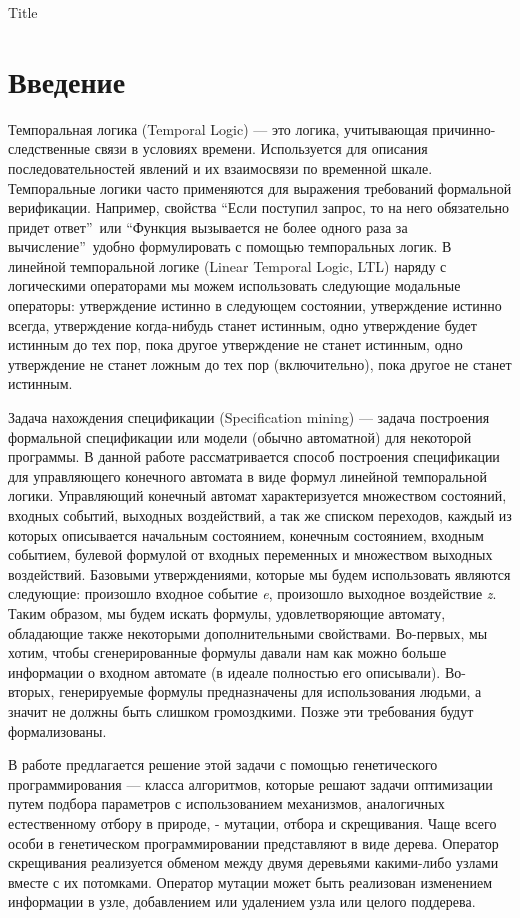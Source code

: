 \documentclass[12pt,fleqn]{article}
\begin{document}
\setlength{\grammarparsep}{0pt plus 1pt minus 1pt}

Title

\section*{Введение}

Темпоральная логика (Temporal Logic) --- это логика, учитывающая причинно-следственные связи в условиях времени.
Используется для описания последовательностей явлений и их взаимосвязи по временной шкале.
Темпоральные логики часто применяются для выражения требований формальной верификации.
Например, свойства ``Если поступил запрос, то на него обязательно придет ответ''\ или
``Функция вызывается не более одного раза за вычисление''\ удобно формулировать с помощью темпоральных логик.
В линейной темпоральной логике (Linear Temporal Logic, LTL) наряду с логическими операторами мы можем 
использовать следующие модальные операторы: утверждение истинно в следующем состоянии,
утверждение истинно всегда, утверждение когда-нибудь станет истинным,
одно утверждение будет истинным до тех пор, пока другое утверждение не станет истинным,
одно утверждение не станет ложным до тех пор (включительно), пока другое не станет истинным.

Задача нахождения спецификации (Specification mining) --- задача построения формальной спецификации или модели
(обычно автоматной) для некоторой программы. В данной работе рассматривается способ построения спецификации
для управляющего конечного автомата в виде формул линейной темпоральной логики.
Управляющий конечный автомат характеризуется множеством состояний, входных событий, выходных воздействий,
а так же списком переходов, каждый из которых описывается начальным состоянием, конечным состоянием,
входным событием, булевой формулой от входных переменных и множеством выходных воздействий.
Базовыми утверждениями, которые мы будем использовать являются следующие: произошло входное событие
\emph{e}, произошло выходное воздействие \emph{z}. Таким образом, мы будем искать формулы, удовлетворяющие автомату,
обладающие также некоторыми дополнительными свойствами. Во-первых, мы хотим, чтобы сгенерированные
формулы давали нам как можно больше информации о входном автомате (в идеале полностью его описывали).
Во-вторых, генерируемые формулы предназначены для использования людьми, а значит не должны быть слишком громоздкими.
Позже эти требования будут формализованы.

В работе предлагается решение этой задачи с помощью генетического программирования --- класса алгоритмов,
которые решают задачи оптимизации путем подбора параметров с использованием механизмов, аналогичных естественному
отбору в природе, - мутации, отбора и скрещивания. Чаще всего особи в генетическом программировании представляют
в виде дерева. Оператор скрещивания реализуется обменом между двумя деревьями какими-либо узлами вместе с их
потомками. Оператор мутации может быть реализован изменением информации в узле, добавлением или удалением узла
или целого поддерева.
\end{document}
